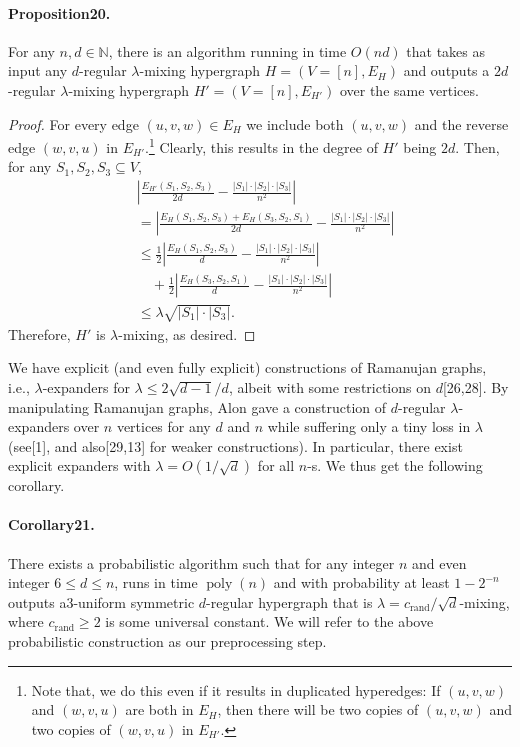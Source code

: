 \documentclass[10pt,a4paper]{article}
\begin{document}
\paragraph{Proposition20.} For any $n,d\in\mathbb N$, there is an algorithm running in time $O(nd)$ that takes as input any $d$-regular $\lambda$-mixing hypergraph $H=(V=[n],E_H)$ and outputs a $2d$-regular $\lambda$-mixing hypergraph $H'=(V=[n],E_{H'})$ over the same vertices.
\begin{proof}
For every edge $(u,v,w)\in E_H$ we include both $(u,v,w)$ and the reverse edge $(w,v,u)$ in $E_{H'}$.\footnote{Note that, we do this even if it results in duplicated hyperedges: If $(u,v,w)$ and $(w,v,u)$ are both in $E_H$, then there will be two copies of $(u,v,w)$ and two copies of $(w,v,u)$ in $E_{H'}$.} Clearly, this results in the degree of $H'$ being $2d$. Then, for any $S_1,S_2,S_3\subseteq V$,
\begin{align*}
&\left|\frac{E_{H'}(S_1,S_2,S_3)}{2d}-\frac{|S_1|\cdot|S_2|\cdot|S_3|}{n^2}\right|\\
&=\left|\frac{E_H(S_1,S_2,S_3)+E_H(S_3,S_2,S_1)}{2d}-\frac{|S_1|\cdot|S_2|\cdot|S_3|}{n^2}\right|\\
&\leq\frac12\left|\frac{E_H(S_1,S_2,S_3)}d-\frac{|S_1|\cdot|S_2|\cdot|S_3|}{n^2}\right|\\
&\quad+\frac12\left|\frac{E_H(S_3,S_2,S_1)}d-\frac{|S_1|\cdot|S_2|\cdot|S_3|}{n^2}\right|\\
&\leq\lambda\sqrt{|S_1|\cdot|S_3|}.
\end{align*}
Therefore, $H'$ is $\lambda$-mixing, as desired.
\end{proof}
We have explicit (and even fully explicit) constructions of Ramanujan graphs, i.e., $\lambda$-expanders for $\lambda\leq2\sqrt{d-1}/d$, albeit with some restrictions on $d$[26,28]. By manipulating Ramanujan graphs, Alon gave a construction of $d$-regular $\lambda$-expanders over $n$ vertices for any $d$ and $n$ while suffering only a tiny loss in $\lambda$ (see[1], and also[29,13] for weaker constructions). In particular, there exist explicit expanders with $\lambda=O(1/\sqrt d)$ for all $n$-s. We thus get the following corollary.
\paragraph{Corollary21.} There exists a probabilistic algorithm such that for any integer $n$ and even integer $6\leq d\leq n$, runs in time $\operatorname{poly}(n)$ and with probability at least $1-2^{-n}$ outputs a3-uniform symmetric $d$-regular hypergraph that is $\lambda=c_{\mathrm{rand}}/\sqrt d$-mixing, where $c_{\mathrm{rand}}\geq2$ is some universal constant.
We will refer to the above probabilistic construction as our preprocessing step.
\end{document}
